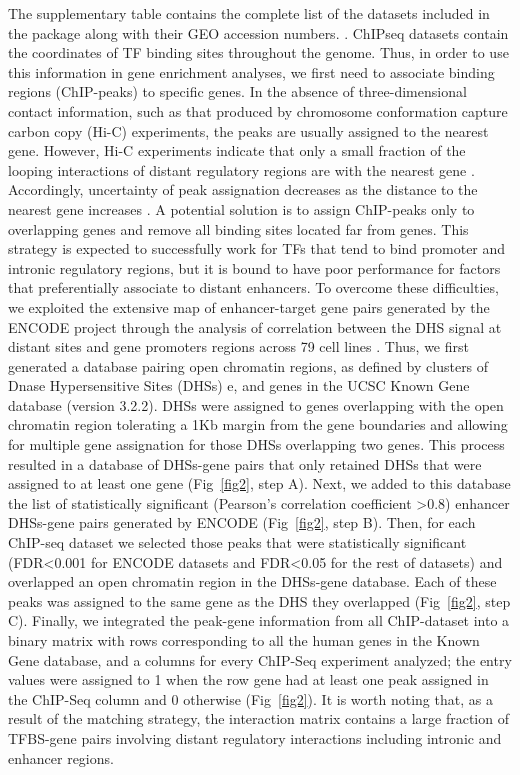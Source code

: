 \documentclass[10pt,letterpaper]{article}
\begin{document}
	The supplementary table  contains the complete list of the datasets included in the package along with their GEO accession numbers. .  
	ChIPseq datasets contain the coordinates of TF binding sites throughout the genome. Thus, in order to use this information in gene enrichment analyses, we first need to associate binding regions (ChIP-peaks) to specific genes. In the absence of three-dimensional contact information, such as that produced by chromosome conformation capture carbon copy (Hi-C) experiments, the peaks are usually assigned to the nearest gene. However, Hi-C experiments indicate that only a small fraction of the looping interactions of  distant regulatory regions are with the nearest gene \cite{Sanyal2012}. Accordingly, uncertainty of peak assignation decreases as the distance to the nearest gene increases \cite{Mifsud2015}. A potential solution is to assign ChIP-peaks only to overlapping genes and remove all binding sites located far from genes. This strategy is expected to successfully work for TFs that tend to bind  promoter and intronic regulatory regions, but it is bound to have poor performance for factors that preferentially associate to distant enhancers. To overcome these difficulties, we exploited the extensive map of enhancer-target gene pairs generated by the ENCODE project through the analysis of correlation between the DHS signal at distant sites and gene promoters regions across 79 cell lines \cite{Thurman2012}. Thus, we first generated a database pairing open chromatin regions, as defined by clusters of Dnase Hypersensitive Sites (DHSs) e\cite{EncodeDHS1}\cite{EncodeDHS2}, and genes in the UCSC Known Gene database (version 3.2.2)\cite{KnownGene}. DHSs were assigned to genes overlapping with the open chromatin region tolerating a 1Kb margin from the gene boundaries and allowing for multiple gene assignation for those DHSs overlapping two genes. This process resulted in a database of DHSs-gene pairs that only retained DHSs that were assigned to at least one gene (Fig~\ref{fig2}, step A). Next, we added to this database the list of statistically significant (Pearson's correlation coefficient >0.8) enhancer DHSs-gene pairs generated by ENCODE \cite{Thurman2012} (Fig~\ref{fig2}, step B). Then, for each ChIP-seq dataset we selected those peaks that were statistically significant (FDR<0.001 for ENCODE datasets and FDR<0.05 for the rest of datasets) and overlapped an open chromatin region in the DHSs-gene database. Each of these peaks was assigned to the same gene as the DHS they overlapped (Fig~\ref{fig2}, step C). Finally, we integrated the peak-gene information from all ChIP-dataset into a binary matrix with rows corresponding to all the human genes in the Known Gene database, and a columns for every ChIP-Seq experiment analyzed; the entry values were assigned to 1 when the row gene had at least one peak assigned in the ChIP-Seq column and 0 otherwise (Fig~\ref{fig2}). It is worth noting that, as a result of the matching strategy, the interaction matrix contains a large fraction of TFBS-gene pairs involving distant regulatory interactions including intronic \cite{Mifsud2015} and enhancer regions.
	
\end{document}
